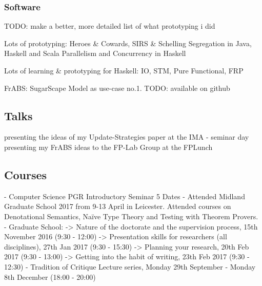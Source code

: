 \subsubsection{Software}
TODO: make a better, more detailed list of what prototyping i did

Lots of prototyping:
Heroes \& Cowards, SIRS \& Schelling Segregation in Java, Haskell and Scala
Parallelism and Concurrency in Haskell

Lots of learning \& prototyping for Haskell:
IO, STM, Pure Functional, FRP

FrABS: SugarScape Model as use-case no.1. TODO: available on github

\subsection{Talks}
presenting the ideas of my Update-Strategies paper at the IMA - seminar day
presenting my FrABS ideas to the FP-Lab Group at the FPLunch

\subsection{Courses}
- Computer Science PGR Introductory Seminar 5 Dates
- Attended Midland Graduate School 2017 from 9-13 April in Leicester. Attended courses on Denotational Semantics, Naïve Type Theory and Testing with Theorem Provers.
- Graduate School: 
	-> Nature of the doctorate and the supervision process, 15th November 2016 (9:30 - 12:00)
	-> Presentation skills for researchers (all disciplines), 27th Jan 2017 (9:30 - 15:30)
	-> Planning your research, 20th Feb 2017 (9:30 - 13:00)
	-> Getting into the habit of writing, 23th Feb 2017 (9:30 - 12:30)
- Tradition of Critique Lecture series, Monday 29th September - Monday 8th December (18:00 - 20:00)